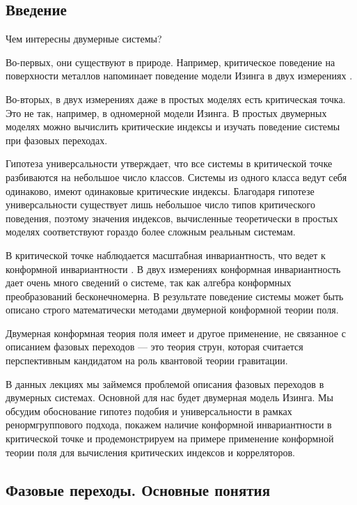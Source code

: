 \documentclass[a4paper,12pt]{article} \usepackage[utf8x]{inputenc} \usepackage[russian]{babel}
\theoremstyle{definition} \newtheorem{corollary}{Corollary}[theorem] \theoremstyle{definition}
\begin{document}
\subsection{Введение}
\label{sec:intro} Чем интересны двумерные системы?

Во-первых, они существуют в природе. Например, критическое поведение на поверхности металлов
напоминает поведение модели Изинга в двух измерениях \cite{campuzano1985110}.

Во-вторых, в двух измерениях даже в простых моделях есть критическая точка. Это не так, например, в
одномерной модели Изинга. В простых двумерных моделях можно вычислить критические индексы и изучать
поведение системы при фазовых переходах.

Гипотеза универсальности утверждает, что все системы в критической точке разбиваются на небольшое
число классов. Системы из одного класса ведут себя одинаково, имеют одинаковые критические индексы.
Благодаря гипотезе универсальности существует лишь небольшое число типов критического поведения,
поэтому значения индексов, вычисленные теоретически в простых моделях соответствуют гораздо более
сложным реальным системам.

В критической точке наблюдается масштабная инвариантность, что ведет к конформной инвариантности
\cite{Polyakov:1970xd}. В двух измерениях конформная инвариантность дает очень много сведений о
системе, так как алгебра конформных преобразований бесконечномерна. В результате поведение системы
может быть описано строго математически методами двумерной конформной теории поля.

Двумерная конформная теория поля имеет и другое применение, не связанное с описанием фазовых
переходов --- это теория струн, которая считается перспективным кандидатом на роль квантовой теории
гравитации.

В данных лекциях мы займемся проблемой описания фазовых переходов в двумерных системах. Основной для
нас будет двумерная модель Изинга. Мы обсудим обоснование гипотез подобия и универсальности в рамках
ренормгруппового подхода, покажем наличие конформной инвариантности в критической точке и
продемонстрируем на примере применение конформной теории поля для вычисления критических индексов и
корреляторов.

\subsection{Фазовые переходы. Основные понятия}
\label{sec:phase-transitions}
\end{document}
